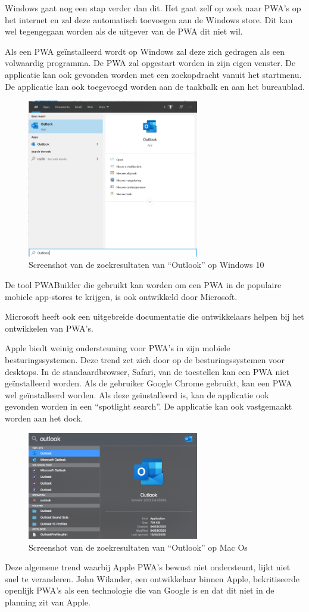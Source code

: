 Windows gaat nog een stap verder dan dit. Het gaat zelf op zoek naar PWA’s op het internet en zal deze automatisch toevoegen aan de Windows store. Dit kan wel tegengegaan worden als de uitgever van de PWA dit niet wil.
\autocite{Gustafson2017} \autocite{Gustafson2017a}

Als een PWA geïnstalleerd wordt op Windows zal deze zich gedragen als een volwaardig programma. De PWA zal opgestart worden in zijn eigen venster. De applicatie kan ook gevonden worden met een zoekopdracht vanuit het startmenu. De applicatie kan ook toegevoegd worden aan de taakbalk en aan het bureaublad.

\begin{figure}[H]
	\centering
	\includegraphics[width=75mm]{./img/Outlook_search_windows.png}
	\caption{Screenshot van de zoekresultaten van “Outlook” op Windows 10}
\end{figure}


De tool PWABuilder die gebruikt kan worden om een PWA in de populaire mobiele app-stores te krijgen, is ook ontwikkeld door Microsoft.
\autocite{PWAbuilder2020}

Microsoft heeft ook een uitgebreide documentatie die ontwikkelaars helpen bij het ontwikkelen van PWA’s.
\autocite{Microsoft2020b}


Apple biedt weinig ondersteuning voor PWA’s in zijn mobiele besturingssystemen. Deze trend zet zich door op de besturingssystemen voor desktops. In de standaardbrowser, Safari, van de toestellen kan een PWA niet geïnstalleerd worden. Als de gebruiker Google Chrome gebruikt, kan een PWA wel geïnstalleerd worden. Als deze geïnstalleerd is, kan de applicatie ook gevonden worden in een “spotlight search”. De applicatie kan ook vastgemaakt worden aan het dock.

\begin{figure}[H]
	\centering
	\includegraphics[width=75mm]{./img/Outlook_search_mac.png}
	\caption{Screenshot van de zoekresultaten van “Outlook” op Mac Os}
\end{figure}

Deze algemene trend waarbij Apple PWA’s bewust niet ondersteunt, lijkt niet snel te veranderen. John Wilander, een ontwikkelaar binnen Apple, bekritiseerde openlijk PWA’s als een technologie die van Google is en dat dit niet in de planning zit van Apple. 
\autocite{Wilander2019}